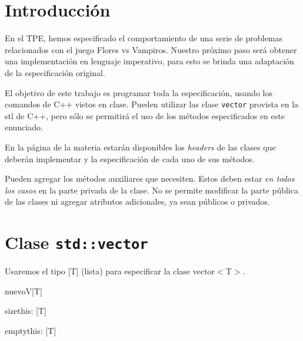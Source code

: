 \documentclass[spanish,a4paper]{article}
\begin{document}



\titulotp

\section{Introducci\'on}

En el TPE, hemos especificado el comportamiento de una serie de 
problemas relacionados con el juego Flores vs Vampiros. Nuestro pr\'oximo paso ser\'a
obtener una implementaci\'on en lenguaje imperativo, para esto se brinda una adaptaci\'on de la especificaci\'on original.

El objetivo de este trabajo es programar toda la especificaci\'on, usando los
comandos de C++ vistos en clase. Pueden utilizar las clase \texttt{vector} provista en la stl de C++, pero s\'olo se permitir\'a el uso de los m\'etodos especificados en este enunciado.

En la p\'agina de la materia estar\'an disponibles los \emph{headers} de las clases que deber\'an
implementar y la especificaci\'on de cada uno de sus m\'etodos.

Pueden agregar los m\'etodos auxiliares que necesiten. Estos deben
estar \emph{en todos los casos} en la parte privada de la clase. No se
permite modificar la parte p\'ublica de las clases ni agregar atributos
adicionales, ya sean p\'ublicos o privados. 


\section{Clase \texttt{std::vector}}
Usaremos el tipo [T] (lista) para especificar la clase vector$<$T$>$. 

\begin{problema}[this]{nuevoV}{}{[T]}
\end{problema}

\begin{problema}{size}{this: [T]}{\ent}
\end{problema}

\begin{problema}{empty}{this: [T]}{\bool}
\end{problema}
\end{document}

